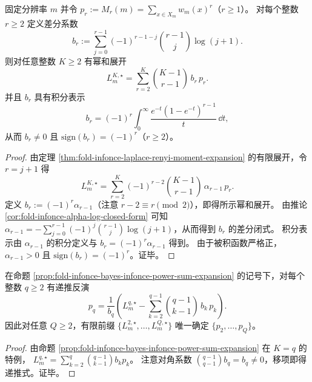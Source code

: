 \begin{proposition}\label{prop:fold-infonce-bayes-infonce-power-sum-expansion}
固定分辨率 \(m\) 并令 \(p_r:=M_r(m)=\sum_{x\in X_m}w_m(x)^r\)（\(r\ge 1\)）。
对每个整数 \(r\ge 2\) 定义差分系数
\[
b_r:=\sum_{j=0}^{r-1}(-1)^{r-1-j}\binom{r-1}{j}\log(j+1).
\]
则对任意整数 \(K\ge 2\) 有幂和展开
\[
L_m^{K,\star}=\sum_{r=2}^{K}\binom{K-1}{r-1}\,b_r\,p_r.
\]
并且 \(b_r\) 具有积分表示
\[
b_r=(-1)^r\int_{0}^{\infty}\frac{e^{-t}(1-e^{-t})^{r-1}}{t}\,\dd t,
\]
从而 \(b_r\neq 0\) 且 \(\mathrm{sign}(b_r)=(-1)^r\)（\(r\ge 2\)）。
\end{proposition}
\begin{proof}
由定理 \ref{thm:fold-infonce-laplace-renyi-moment-expansion} 的有限展开，令 \(r=j+1\) 得
\[
L_m^{K,\star}
=\sum_{r=2}^{K}(-1)^{r-2}\binom{K-1}{r-1}\,\alpha_{r-1}\,p_r.
\]
定义 \(b_r:=(-1)^r\alpha_{r-1}\)（注意 \(r-2\equiv r\pmod 2\)），即得所示幂和展开。
由推论 \ref{cor:fold-infonce-alpha-log-closed-form} 可知
\(
\alpha_{r-1}=-\sum_{j=0}^{r-1}(-1)^j\binom{r-1}{j}\log(j+1)
\)，从而得到 \(b_r\) 的差分闭式。
积分表示由 \(\alpha_{r-1}\) 的积分定义与 \(b_r=(-1)^r\alpha_{r-1}\) 得到。
由于被积函数严格正，\(\alpha_{r-1}>0\) 且 \(\mathrm{sign}(b_r)=(-1)^r\)。证毕。
\end{proof}

\begin{corollary}[损失塔对幂和的三角反演]\label{cor:fold-infonce-loss-tower-triangular-inversion-power-sums}
在命题 \ref{prop:fold-infonce-bayes-infonce-power-sum-expansion} 的记号下，对每个整数 \(q\ge 2\) 有递推反演
\[
p_q
=\frac{1}{b_q}\left(
L_m^{q,\star}-\sum_{k=2}^{q-1}\binom{q-1}{k-1}\,b_k\,p_k
\right).
\]
因此对任意 \(Q\ge 2\)，有限前缀 \(\{L_m^{2,\star},\dots,L_m^{Q,\star}\}\) 唯一确定 \(\{p_2,\dots,p_Q\}\)。
\end{corollary}
\begin{proof}
由命题 \ref{prop:fold-infonce-bayes-infonce-power-sum-expansion} 在 \(K=q\) 的特例，
\(
L_m^{q,\star}=\sum_{k=2}^{q}\binom{q-1}{k-1}b_k p_k
\)。
注意对角系数 \(\binom{q-1}{q-1}b_q=b_q\neq 0\)，移项即得递推式。证毕。
\end{proof}

